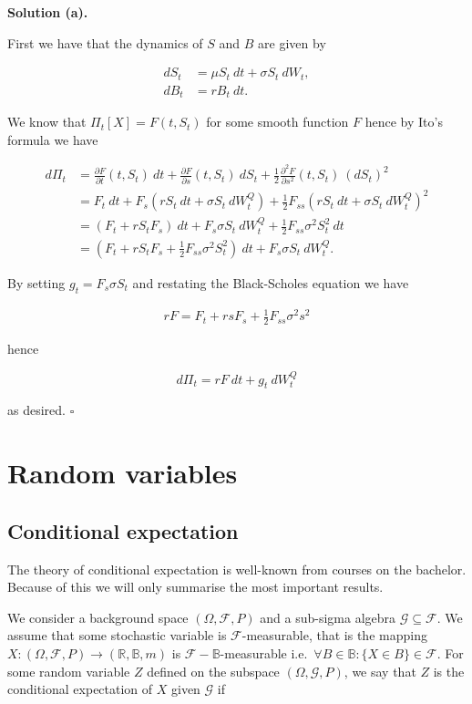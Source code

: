 \documentclass[
]{article}
\begin{document}
\textbf{Solution (a).}

First we have that the dynamics of \(S\) and \(B\) are given by

\begin{align*}
dS_t&=\mu S_t\ dt + \sigma S_t\ dW_t,\\
dB_t&=rB_t\ dt.
\end{align*}

We know that \(\Pi_t[X]=F(t,S_t)\) for some smooth function \(F\) hence
by Ito's formula we have

\begin{align*}
d\Pi_t&=\frac{\partial F}{\partial t}(t,S_t)\ dt +\frac{\partial F}{\partial s}(t,S_t)\ dS_t+\frac{1}{2}\frac{\partial^2 F}{\partial s^2}(t,S_t)\ (dS_t)^2\\
&=F_t\ dt+F_s(r S_t\ dt + \sigma S_t\ dW^Q_t)+\frac{1}{2}F_{ss}(r S_t\ dt + \sigma S_t\ dW^Q_t)^2\\
&=(F_t+r S_t F_s)\ dt+F_s\sigma S_t\ dW^Q_t+\frac{1}{2}F_{ss}\sigma ^2S_t^2\ dt\\
&=(F_t+r S_tF_s+\frac{1}{2}F_{ss}\sigma ^2S_t^2)\ dt+F_s\sigma S_t\ dW^   Q_t.
\end{align*}

By setting \(g_t=F_s\sigma S_t\) and restating the Black-Scholes
equation we have

\begin{align*}
rF=F_t+rsF_s+\frac{1}{2}F_{ss}\sigma ^2 s^2
\end{align*}

hence

\[
d\Pi_t=r F\ dt+g_t\ dW^Q_t
\]

as desired. \(\square\)

\hypertarget{random-variables}{%
\section{Random variables}\label{random-variables}}

\hypertarget{conditional-expectation}{%
\subsection{Conditional expectation}\label{conditional-expectation}}

The theory of conditional expectation is well-known from courses on the
bachelor. Because of this we will only summarise the most important
results.

We consider a background space \((\Omega,\mathcal{F},P)\) and a
sub-sigma algebra \(\mathcal{G}\subseteq \mathcal{F}\). We assume that
some stochastic variable is \(\mathcal{F}\)-measurable, that is the
mapping \(X : (\Omega,\mathcal{F},P) \to (\mathbb{R},\mathbb{B},m)\) is
\(\mathcal{F}-\mathbb{B}\)-measurable
i.e.~\(\forall B\in\mathbb{B} : \{X\in B\}\in\mathcal{F}\). For some
random variable \(Z\) defined on the subspace
\((\Omega,\mathcal{G},P)\), we say that \(Z\) is the conditional
expectation of \(X\) given \(\mathcal{G}\) if
\end{document}
